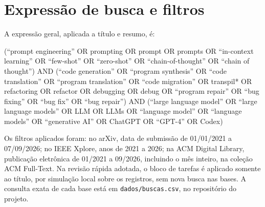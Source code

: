 \appendices
\section{Expressão de busca e filtros}\label{ap:busca}
A expressão geral, aplicada a título e resumo, é:

{\footnotesize\raggedright
(``prompt engineering'' OR prompting OR prompt OR prompts OR ``in-context learning'' OR ``few-shot''
OR ``zero-shot'' OR ``chain-of-thought'' OR ``chain of thought'') AND (``code generation'' OR
``program synthesis'' OR ``code translation'' OR ``program translation'' OR ``code migration'' OR
transpil* OR refactoring OR refactor OR debugging OR debug OR ``program repair'' OR ``bug fixing'' OR
``bug fix'' OR ``bug repair'') AND (``large language model'' OR ``large language models'' OR LLM OR
LLMs OR ``language model'' OR ``language models'' OR ``generative AI'' OR ChatGPT OR ``GPT-4'' OR
Codex)\par}

\medskip
Os filtros aplicados foram: no arXiv, data de submissão de 01/01/2021 a 07/09/2026; no IEEE Xplore,
anos de 2021 a 2026; na ACM Digital Library, publicação eletrônica de 01/2021 a 09/2026, incluindo o
mês inteiro, na coleção ACM Full-Text. Na revisão rápida adotada, o bloco de tarefas é aplicado somente ao
título, por simulação local sobre os registros, sem nova busca nas bases. A consulta exata de cada base está em \texttt{dados/buscas.csv}, no repositório do projeto.
